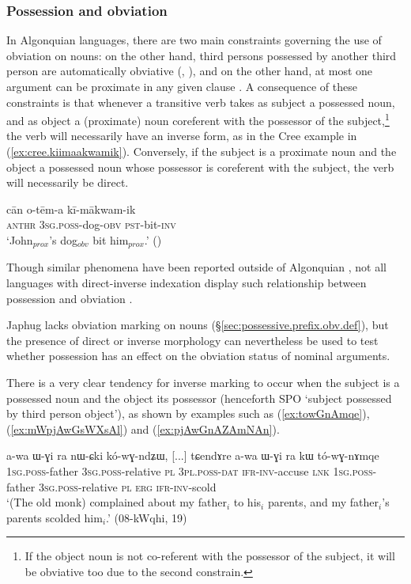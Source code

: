   
\subsubsection{Possession and obviation} \label{sec:obviation.possessor}
In Algonquian languages, there are two main constraints governing the use of obviation on nouns: on the other hand, third persons possessed by another third person are automatically obviative (\citealt[25]{wolfart73}, \citealt[625]{valentine01grammar}), and on the other hand, at most one argument can be proximate in any given clause  \citep[627]{valentine01grammar}. A consequence of these constraints is that whenever a transitive verb takes as subject a possessed noun, and as object a (proximate) noun coreferent with the possessor of the subject,\footnote{If the object noun is not co-referent with the possessor of the subject, it will be obviative too due to the second constrain. } the verb will necessarily have an inverse form, as in the Cree example in (\ref{ex:cree.kiimaakwamik}). Conversely, if the subject is a proximate noun and the object a possessed noun whose possessor is coreferent with the subject, the verb will necessarily be direct.

\begin{exe}
\ex \label{ex:cree.kiimaakwamik}
 \gll cān o-tēm-a kī-mākwam-ik  \\
  \textsc{anthr} \textsc{3sg}.\textsc{poss}-dog-\textsc{obv} \textsc{pst}-bit-\textsc{inv} \\
 \glt `John$_{prox}$'s dog$_{obv}$ bit him$_{prox}$.' (\citealt[25]{wolfart73})
\end{exe}

Though similar phenomena have been reported outside of Algonquian \citep{aissen97obviation}, not all languages with direct-inverse indexation display such relationship between possession and obviation \citep{haude16symmetrical}.
 
Japhug lacks obviation marking on nouns (§\ref{sec:possessive.prefix.obv.def}), but the presence of direct or inverse morphology can nevertheless be used to test whether possession has an effect on the obviation status of nominal arguments.

There is a very clear tendency for inverse marking to occur when the subject is a possessed noun and the object its possessor (henceforth  SPO `subject possessed by third person object'), as shown by examples such as (\ref{ex:towGnAmqe}), (\ref{ex:mWpjAwGsWXsAl}) and (\ref{ex:pjAwGnAZAmNAn}).

\begin{exe}
\ex \label{ex:towGnAmqe}
 \gll   a-wa ɯ-ɣi ra nɯ-ɕki kó-wɣ-ndʑɯ, [...] tɕendɤre  a-wa ɯ-ɣi ra kɯ tó-wɣ-nɤmqe \\
  \textsc{1sg}.\textsc{poss}-father \textsc{3sg}.\textsc{poss}-relative  \textsc{pl} \textsc{3pl}.\textsc{poss}-\textsc{dat} \textsc{ifr}-\textsc{inv}-accuse  {  } \textsc{lnk}  \textsc{1sg}.\textsc{poss}-father \textsc{3sg}.\textsc{poss}-relative \textsc{pl} \textsc{erg} \textsc{ifr}-\textsc{inv}-scold \\
 \glt `(The old monk) complained about my father$_i$ to his$_i$ parents, and my father$_i$'s parents scolded him$_i$.' (08-kWqhi, 19)
\end{exe}  
  
